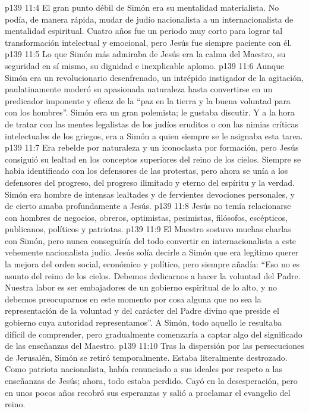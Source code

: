 \vs p139 11:4 El gran punto débil de Simón era su mentalidad materialista. No podía, de manera rápida, mudar de judío nacionalista a un internacionalista de mentalidad espiritual. Cuatro años fue un periodo muy corto para lograr tal transformación intelectual y emocional, pero Jesús fue siempre paciente con él.
\vs p139 11:5 \pc Lo que Simón más admiraba de Jesús era la calma del Maestro, su seguridad en sí mismo, su dignidad e inexplicable aplomo.
\vs p139 11:6 \pc Aunque Simón era un revolucionario desenfrenado, un intrépido instigador de la agitación, paulatinamente moderó su apasionada naturaleza hasta convertirse en un predicador imponente y eficaz de la “paz en la tierra y la buena voluntad para con los hombres”. Simón era un gran polemista; le gustaba discutir. Y a la hora de tratar con las mentes legalistas de los judíos eruditos o con las nimias críticas intelectuales de los griegos, era a Simón a quien siempre se le asignaba esta tarea.
\vs p139 11:7 Era rebelde por naturaleza y un iconoclasta por formación, pero Jesús consiguió su lealtad en los conceptos superiores del reino de los cielos. Siempre se había identificado con los defensores de las protestas, pero ahora se unía a los defensores del progreso, del progreso ilimitado y eterno del espíritu y la verdad. Simón era hombre de intensas lealtades y de fervientes devociones personales, y de cierto amaba profundamente a Jesús.
\vs p139 11:8 \pc Jesús no temía relacionarse con hombres de negocios, obreros, optimistas, pesimistas, filósofos, escépticos, publicanos, políticos y patriotas.
\vs p139 11:9 \pc El Maestro sostuvo muchas charlas con Simón, pero nunca conseguiría del todo convertir en internacionalista a este vehemente nacionalista judío. Jesús solía decirle a Simón que era legítimo querer la mejora del orden social, económico y político, pero siempre añadía: “Eso no es asunto del reino de los cielos. Debemos dedicarnos a hacer la voluntad del Padre. Nuestra labor es ser embajadores de un gobierno espiritual de lo alto, y no debemos preocuparnos en este momento por cosa alguna que no sea la representación de la voluntad y del carácter del Padre divino que preside el gobierno cuya autoridad representamos”. A Simón, todo aquello le resultaba difícil de comprender, pero gradualmente comenzaría a captar algo del significado de las enseñanzas del Maestro.
\vs p139 11:10 \pc Tras la dispersión por las persecuciones de Jerusalén, Simón se retiró temporalmente. Estaba literalmente destrozado. Como patriota nacionalista, había renunciado a sus ideales por respeto a las enseñanzas de Jesús; ahora, todo estaba perdido. Cayó en la desesperación, pero en unos pocos años recobró sus esperanzas y salió a proclamar el evangelio del reino.
